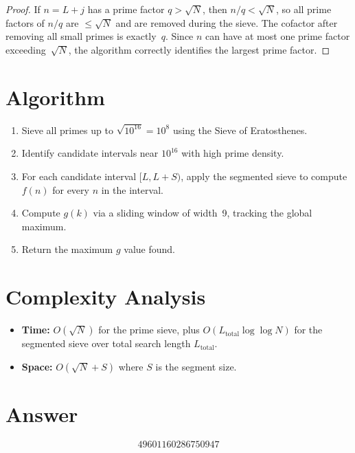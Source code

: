 \documentclass[11pt]{article}
\begin{document}
\begin{proof}
If $n = L + j$ has a prime factor $q > \sqrt{N}$, then $n/q < \sqrt{N}$, so all prime factors of $n/q$ are $\le \sqrt{N}$ and are removed during the sieve. The cofactor after removing all small primes is exactly~$q$. Since $n$ can have at most one prime factor exceeding~$\sqrt{N}$, the algorithm correctly identifies the largest prime factor.
\end{proof}

\section{Algorithm}

\begin{enumerate}
    \item Sieve all primes up to $\sqrt{10^{16}} = 10^8$ using the Sieve of Eratosthenes.
    \item Identify candidate intervals near $10^{16}$ with high prime density.
    \item For each candidate interval $[L, L+S)$, apply the segmented sieve to compute $f(n)$ for every $n$ in the interval.
    \item Compute $g(k)$ via a sliding window of width~9, tracking the global maximum.
    \item Return the maximum $g$ value found.
\end{enumerate}

\section{Complexity Analysis}
\begin{itemize}
    \item \textbf{Time:} $O(\sqrt{N})$ for the prime sieve, plus $O(L_{\mathrm{total}} \log\log N)$ for the segmented sieve over total search length $L_{\mathrm{total}}$.
    \item \textbf{Space:} $O(\sqrt{N} + S)$ where $S$ is the segment size.
\end{itemize}

\section{Answer}

\[
\boxed{49601160286750947}
\]
\end{document}
